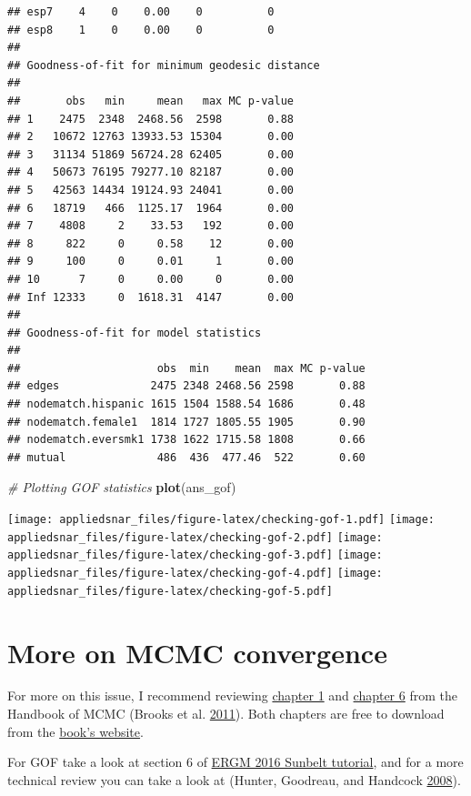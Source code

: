 \documentclass[]{book}
\newenvironment{Shaded}{\begin{snugshade}}{\end{snugshade}}
\newcommand{\KeywordTok}[1]{\textcolor[rgb]{0.13,0.29,0.53}{\textbf{#1}}}
\newcommand{\CommentTok}[1]{\textcolor[rgb]{0.56,0.35,0.01}{\textit{#1}}}
\newcommand{\NormalTok}[1]{#1}
\theoremstyle{definition}
\theoremstyle{definition}
\theoremstyle{definition}
\theoremstyle{remark}
\begin{document}
\begin{verbatim}
## esp7    4    0    0.00    0          0
## esp8    1    0    0.00    0          0
## 
## Goodness-of-fit for minimum geodesic distance 
## 
##       obs   min     mean   max MC p-value
## 1    2475  2348  2468.56  2598       0.88
## 2   10672 12763 13933.53 15304       0.00
## 3   31134 51869 56724.28 62405       0.00
## 4   50673 76195 79277.10 82187       0.00
## 5   42563 14434 19124.93 24041       0.00
## 6   18719   466  1125.17  1964       0.00
## 7    4808     2    33.53   192       0.00
## 8     822     0     0.58    12       0.00
## 9     100     0     0.01     1       0.00
## 10      7     0     0.00     0       0.00
## Inf 12333     0  1618.31  4147       0.00
## 
## Goodness-of-fit for model statistics 
## 
##                     obs  min    mean  max MC p-value
## edges              2475 2348 2468.56 2598       0.88
## nodematch.hispanic 1615 1504 1588.54 1686       0.48
## nodematch.female1  1814 1727 1805.55 1905       0.90
## nodematch.eversmk1 1738 1622 1715.58 1808       0.66
## mutual              486  436  477.46  522       0.60
\end{verbatim}

\begin{Shaded}
\begin{Highlighting}[]
\CommentTok{# Plotting GOF statistics}
\KeywordTok{plot}\NormalTok{(ans_gof)}
\end{Highlighting}
\end{Shaded}

\texttt{[image: appliedsnar\_files/figure-latex/checking-gof-1.pdf]}
\texttt{[image: appliedsnar\_files/figure-latex/checking-gof-2.pdf]}
\texttt{[image: appliedsnar\_files/figure-latex/checking-gof-3.pdf]}
\texttt{[image: appliedsnar\_files/figure-latex/checking-gof-4.pdf]}
\texttt{[image: appliedsnar\_files/figure-latex/checking-gof-5.pdf]}

\section{More on MCMC convergence}\label{more-on-mcmc-convergence}

For more on this issue, I recommend reviewing
\href{http://www.mcmchandbook.net/HandbookChapter1.pdf}{chapter 1} and
\href{http://www.mcmchandbook.net/HandbookChapter6.pdf}{chapter 6} from
the Handbook of MCMC (Brooks et al.
\protect\hyperlink{ref-brooks2011}{2011}). Both chapters are free to
download from the
\href{http://www.mcmchandbook.net/HandbookSampleChapters.html}{book's
website}.

For GOF take a look at section 6 of
\href{https://statnet.csde.washington.edu/trac/raw-attachment/wiki/Sunbelt2016/ergm_tutorial.html}{ERGM
2016 Sunbelt tutorial}, and for a more technical review you can take a
look at (Hunter, Goodreau, and Handcock
\protect\hyperlink{ref-HunterJASA2008}{2008}).
\end{document}

